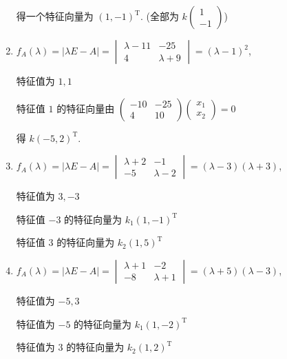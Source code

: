 \begin{enumerate}
                   得一个特征向量为 \( (1, -1)^{\mathrm{T}} \). (全部为 \( k\begin{pmatrix}
                       1 \\
                       -1
                   \end{pmatrix} \))
             \item %
                   \( f_{A}(\lambda) = |\lambda E - A| = \begin{vmatrix}
                       \lambda - 11 & -25         \\
                       4            & \lambda + 9
                   \end{vmatrix} = (\lambda - 1)^{2} \),

                   特征值为 \( 1, 1 \)

                   特征值 \( 1 \) 的特征向量由 \( \begin{pmatrix}
                       -10 & -25 \\
                       4   & 10
                   \end{pmatrix}\begin{pmatrix}
                       x_{1} \\
                       x_{2}
                   \end{pmatrix} = 0 \)

                   得 \( k(-5, 2)^{\mathrm{T}} \).
             \item %
                   \( f_{A}(\lambda) = |\lambda E - A| = \begin{vmatrix}
                       \lambda + 2 & -1          \\
                       -5          & \lambda - 2
                   \end{vmatrix} = (\lambda - 3)(\lambda + 3) \),

                   特征值为 \( 3, -3 \)

                   特征值 \( -3 \) 的特征向量为 \( k_1(1, -1)^{\mathrm{T}} \)

                   特征值 \( 3 \) 的特征向量为 \( k_2(1, 5)^{\mathrm{T}} \)
             \item %
                   \( f_{A}(\lambda) = |\lambda E - A| = \begin{vmatrix}
                       \lambda + 1 & -2          \\
                       -8          & \lambda + 1
                   \end{vmatrix} = (\lambda + 5)(\lambda - 3) \),

                   特征值为 \( -5, 3 \)

                   特征值为 \( -5 \) 的特征向量为 \( k_1(1, -2)^{\mathrm{T}} \)

                   特征值为 \( 3 \) 的特征向量为 \( k_2(1, 2)^{\mathrm{T}} \)
         \end{enumerate}

